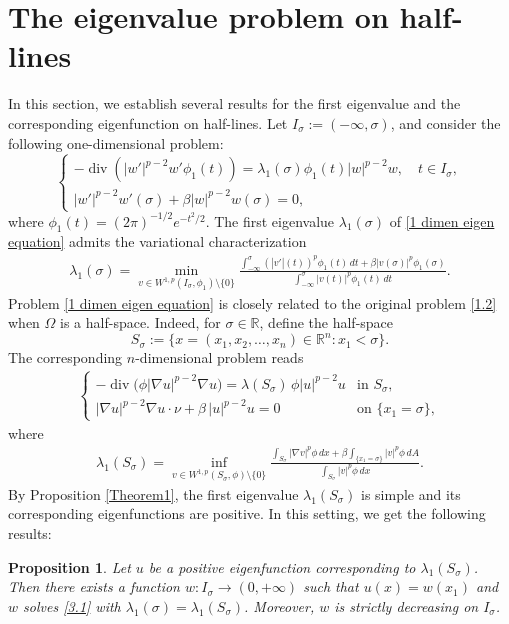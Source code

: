 \documentclass[11pt,leqno]{amsart}
\newtheorem{proposition}{Proposition}[section]
\def\R{\mathbb{R}}
\def\div{\operatorname{div}}
\numberwithin{equation}{section}
\begin{document}
\section{The eigenvalue problem on half-lines}\label{sect3}
In this section, we establish several results for the first eigenvalue and the corresponding eigenfunction on half-lines. Let $I_{\sigma}:=(-\infty, \sigma)$, and consider the following one-dimensional problem:
\begin{equation}\label{1 dimen eigen equation}
\begin{cases}
-\div\left(|w'|^{p-2}w'\phi _1(t)\right)=\lambda_1(\sigma)\phi _1(t)|w|^{p-2}w, \quad t \in I_{\sigma},\\
|w'|^{p-2}w'(\sigma)+\beta|w|^{p-2}w(\sigma)=0,
\end{cases}
\end{equation}
where $\phi _1(t)=(2\pi)^{-1/2}e^{-t^2/2}$.
The  first eigenvalue $\lambda_1(\sigma)$ of \eqref{1 dimen eigen equation} admits the variational characterization
\begin{align}\label{3.1}
\lambda_1(\sigma) = \min_{v \in W^{1,p}(I_\sigma,\phi _1)\setminus\{0\}}
\frac{\displaystyle \int_{-\infty}^{\sigma} (|v'|(t))^p \phi _1(t)\,dt + \beta |v(\sigma)|^p\phi _1(\sigma)}
{\displaystyle \int_{-\infty}^{\sigma} |v(t)|^p \phi _1(t)\,dt}.
\end{align}
Problem \eqref{1 dimen eigen equation} is  closely related to the original problem \eqref{1.2} when $\Omega$ is a half-space. Indeed, for $\sigma\in \R$, define the half-space  
\begin{equation}\label{3.2}
S_{\sigma}:=\{x=(x_1,x_2,\dots,x_n)\in\mathbb{R}^n:x_1<\sigma\}.
\end{equation}
The corresponding $n$-dimensional problem reads
\begin{align}\label{3.3}
\begin{cases}
-\div\bigl(\phi |\nabla u|^{p-2}\nabla u\bigr)=\lambda(S_{\sigma})\,\phi |u|^{p-2}u & \text{in }S_{\sigma},\\[4pt]
|\nabla u|^{p-2}\nabla u\cdot\nu+\beta\,|u|^{p-2}u=0 & \text{on } \{x_1=\sigma\},
\end{cases}
\end{align}
where
\begin{align}\label{3.4}
\lambda_1(S_\sigma)=\inf_{v\in W^{1,p}(S_\sigma,\phi )\setminus\{0\}}
\frac{\int_{S_\sigma}|\nabla v|^p\phi \,dx
+\beta\int_{\{x_1=\sigma\}}|v|^p\phi \,dA}
{\int_{S_\sigma}|v|^p\phi \,dx}.
\end{align}
By Proposition \ref{Theorem1},  the first eigenvalue $\lambda_1(S_\sigma)$ is simple and its corresponding eigenfunctions  are  positive. In this setting, we get the following results: 
\begin{proposition}\label{Theorem2}
Let $u$ be a positive eigenfunction corresponding to $\lambda_1(S_\sigma)$. Then there exists a function $w: I_\sigma \to (0,+\infty)$ such that $u(x)=w(x_1)$ and $w$ solves \eqref{3.1} with $\lambda_1(\sigma) = \lambda_1(S_\sigma)$. Moreover, $w$ is strictly  decreasing on $I_\sigma$.
\end{proposition}
\end{document}
